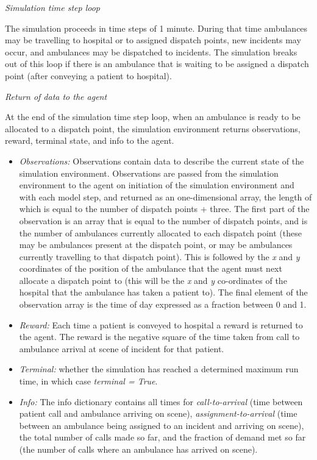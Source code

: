 \documentclass{article}
\begin{document}
\emph{Simulation time step loop}

The simulation proceeds in time steps of 1 minute. During that time ambulances may be travelling to hospital or to assigned dispatch points, new incidents may occur, and ambulances may be dispatched to incidents. The simulation breaks out of this loop if there is an ambulance that is waiting to be assigned a dispatch point (after conveying a patient to hospital).

\emph{Return of data to the agent}

\label{obs}

At the end of the simulation time step loop, when an ambulance is ready to be allocated to a dispatch point, the simulation environment returns observations, reward, terminal state, and info to the agent.

\begin{itemize}

    \item \emph{Observations:}  Observations contain data to describe the current state of the simulation environment. Observations are passed from the simulation environment to the agent on initiation of the simulation environment and with each model step, and returned as an one-dimensional array, the length of which is equal to the number of dispatch points + three. The first part of the observation is an array that is equal to the number of dispatch points, and is the number of ambulances currently allocated to each dispatch point (these may be ambulances present at the dispatch point, or may be ambulances currently travelling to that dispatch point). This is followed by the \emph{x} and \emph{y} coordinates of the position of the ambulance that the agent must next allocate a dispatch point to (this will be the \emph{x} and \emph{y} co-ordinates of the hospital that the ambulance has taken a patient to). The final element of the observation array is the time of day expressed as a fraction between 0 and 1.
    
    \item \emph{Reward:} Each time a patient is conveyed to hospital a reward is returned to the agent. The reward is the negative square of the time taken from call to ambulance arrival at scene of incident for that patient.
    
    \item \emph{Terminal:} whether the simulation has reached a determined maximum run time, in which case \emph{terminal = True}.
    
    \item \emph{Info:} The info dictionary contains all times for \emph{call-to-arrival} (time between patient call and ambulance arriving on scene), \emph{assignment-to-arrival} (time between an ambulance being assigned to an incident and arriving on scene), the total number of calls made so far, and the fraction of demand met so far (the number of calls where an ambulance has arrived on scene).
    
\end{itemize}
\end{document}
